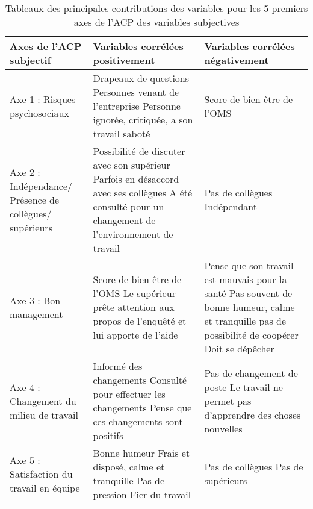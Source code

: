 \documentclass[11pt,fleqn,a4paper,openany,frenchb]{book} %
\begin{document}
\begin{table}[!h]
\centering
\begin{tabular}{|p{4cm}|p{5cm}|p{5cm}|}
	\hline
    Axes de l'ACP subjectif & Variables corrélées positivement & Variables corrélées négativement\\ 
    \hline 
    Axe 1 : Risques psychosociaux
    & Drapeaux de questions 
    \newline Personnes venant de l'entreprise
    \newline Personne ignorée, critiquée, a son travail saboté
    & Score de bien-être de l'OMS\\
    \hline
    Axe 2 : Indépendance/ Présence de collègues/ supérieurs
    & Possibilité de discuter avec son supérieur
    \newline Parfois en désaccord avec ses collègues
    \newline A été consulté pour un changement de l'environnement de travail
    & Pas de collègues
    \newline Indépendant \\
    \hline
    Axe 3 : Bon management
    & Score de bien-être de l'OMS
    \newline Le supérieur prête attention aux propos de l'enquêté et lui apporte de l'aide
    \newline
    & Pense que son travail est mauvais pour la santé
    \newline Pas souvent de bonne humeur, calme et tranquille
    \newline pas de possibilité de coopérer
    \newline Doit se dépêcher\\
    \hline
    Axe 4 : Changement du milieu de travail
    & Informé des changements
    \newline Consulté pour effectuer les changements
    \newline Pense que ces changements sont positifs
    & Pas de changement de poste
    \newline Le travail ne permet pas d'apprendre des choses nouvelles\\
    \hline
    Axe 5 : Satisfaction du travail en équipe 
    & Bonne humeur 
    \newline Frais et disposé, calme et tranquille
    \newline Pas de pression
    \newline Fier du travail
    & Pas de collègues
    \newline Pas de supérieurs\\
    \hline
    
\end{tabular}
\caption{Tableaux des principales contributions des variables pour les 5 premiers axes de l’ACP des variables subjectives}
\label{tab:ACPsubj}
\end{table}
\end{document}
